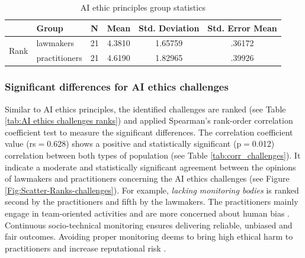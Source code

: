 \begin{table}[]
\centering
\caption{AI ethic principles group statistics}
\label{tab:groupstatistics_principles}
\begin{tabular}{|l|l|c|c|c|c|}
\hline
 & Group & N & Mean & Std. Deviation & Std. Error Mean \\ \hline
\multirow{2}{*}{Rank} & lawmakers & 21 & 4.3810 & 1.65759 & .36172 \\ \cline{2-6} 
 & practitioners & 21 & 4.6190 & 1.82965 & .39926 \\ \hline
\end{tabular}%
\end{table}

\subsubsection{Significant differences for AI ethics challenges} \label{sec: Significant differences for AI ethics challenges}
Similar to AI ethics principles, the identified challenges are ranked (see Table \ref{tab:AI ethics challenges ranks}) and applied Spearman's rank-order correlation coefficient test to measure the significant differences. The correlation coefficient value (rs$=$0.628) shows a positive and statistically significant (p$=$0.012) correlation between both types of population (see Table \ref{tab:corr_challenges}). It indicate a moderate and statistically significant agreement between the opinions of lawmakers and practitioners concerning the AI ethics challenges (see Figure \ref{Fig:Scatter-Ranks-challenges}). For example, \textit{lacking monitoring bodies} is ranked second by the practitioners and fifth by the lawmakers. The practitioners mainly engage in team-oriented activities and are more concerned about human bias \cite{BiasAI}. Continuous socio-technical monitoring ensures delivering reliable, unbiased and fair outcomes. Avoiding proper monitoring deems to bring high ethical harm to practitioners and increase reputational risk \cite{BiasAI}.


